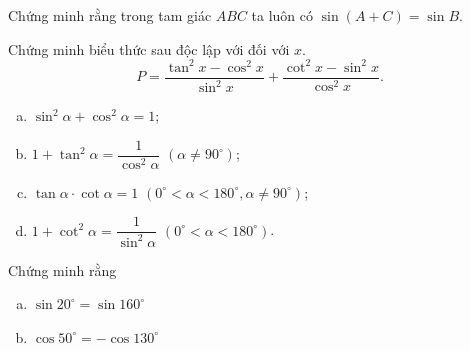\begin{bt}%
	Chứng minh rằng trong tam giác $ABC$ ta luôn có $\sin (A+C)=\sin B$.
\end{bt}

\begin{bt}%
    Chứng minh biểu thức sau độc lập với đối với $x$.
    \[P=\dfrac{\tan^2 x-\cos^2 x}{\sin^2 x}+\dfrac{\cot^2 x-\sin^2 x}{\cos^2 x}.\]
\end{bt}

\begin{bt}%
	\begin{enumerate}[a)]
		\item $\sin^2 \alpha + \cos^2 \alpha =1$;
		\item $1+ \tan^2 \alpha = \dfrac{1}{\cos^2 \alpha}$ $(\alpha \ne 90^\circ)$;
		\item $\tan \alpha  \cdot \cot \alpha =1$ $(0^\circ < \alpha < 180^\circ, \alpha \ne 90^\circ)$;
		\item $1+ \cot^2 \alpha = \dfrac{1}{\sin^2 \alpha}$ $(0^\circ <\alpha < 180^\circ)$.
	\end{enumerate}
\end{bt}

\begin{bt}%
	Chứng minh rằng 
	\begin{enumerate}[a)]
		\item $\sin 20^\circ = \sin 160^\circ$
		\item $\cos 50^\circ = -\cos 130^\circ$
	\end{enumerate}
\end{bt}

